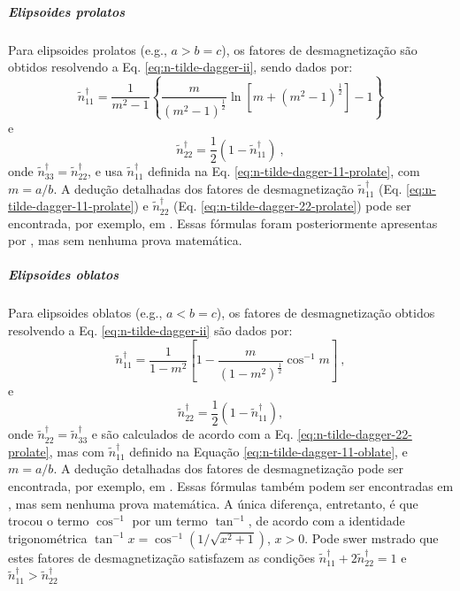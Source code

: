 \subparagraph*{Elipsoides prolatos}

Para elipsoides prolatos (e.g., $a > b = c$), os fatores de desmagnetização
são obtidos resolvendo a Eq. \ref{eq:n-tilde-dagger-ii}, sendo dados por:
\begin{equation}
\tilde{n}^{\dagger}_{11} = \frac{1}{m^{2} - 1}
\left\lbrace \frac{m}{\left( m^{2} - 1 \right)^{\frac{1}{2}}}
\ln \left[ m + \left( m^{2} - 1 \right)^{\frac{1}{2}} \right]
- 1 \right\rbrace
\label{eq:n-tilde-dagger-11-prolate}
\end{equation}
e
\begin{equation}
\tilde{n}^{\dagger}_{22} = \frac{1}{2} \left(1 - \tilde{n}^{\dagger}_{11} \right) \: ,
\label{eq:n-tilde-dagger-22-prolate}
\end{equation}
onde $\tilde{n}^{\dagger}_{33} = \tilde{n}^{\dagger}_{22}$, 
e usa $\tilde{n}^{\dagger}_{11}$ definida na 
Eq. \ref{eq:n-tilde-dagger-11-prolate}, com $m = a/b$.
A dedução detalhadas dos fatores de desmagnetização 
$\tilde{n}^{\dagger}_{11}$ (Eq. \ref{eq:n-tilde-dagger-11-prolate}) 
e $\tilde{n}^{\dagger}_{22}$ (Eq. \ref{eq:n-tilde-dagger-22-prolate})
pode ser encontrada, por exemplo, em \citet{stoner1945}. 
Essas fórmulas foram posteriormente apresentas por
\citet{emerson1985}, mas sem nenhuma prova matemática.

\subparagraph*{Elipsoides oblatos}

Para elipsoides oblatos (e.g., $a < b = c$), os fatores de desmagnetização
obtidos resolvendo a Eq. \ref{eq:n-tilde-dagger-ii} são dados por:
\begin{equation}
\tilde{n}^{\dagger}_{11} = 
\frac{1}{1 - m^{2}} \left[
1 - \frac{m}{\left( 1 - m^{2} \right)^{\frac{1}{2}}} \cos^{-1}m
\right] \: ,
\label{eq:n-tilde-dagger-11-oblate}
\end{equation}
e
\begin{equation}
\tilde{n}^{\dagger}_{22} = 
\frac{1}{2} \left(1 - \tilde{n}^{\dagger}_{11}\right) ,
\label{eq:n-tilde-dagger-22-oblate}
\end{equation}
onde $\tilde{n}^{\dagger}_{22}=\tilde{n}^{\dagger}_{33}$ e
são calculados de acordo com a Eq.
\ref{eq:n-tilde-dagger-22-prolate}, mas com $\tilde{n}^{\dagger}_{11}$ 
definido na Equação \ref{eq:n-tilde-dagger-11-oblate}, 
e $m = a/b$.
A dedução detalhadas dos fatores de desmagnetização 
pode ser encontrada, por exemplo, em \citet{stoner1945}.  Essas fórmulas
também podem ser encontradas em \citet{emerson1985}, mas sem nenhuma prova matemática.
A única diferença, entretanto, é que \citet{emerson1985} trocou o termo $\cos^{-1}$
por um termo $\tan^{-1}$, de acordo com a identidade trigonométrica
$\tan^{-1}x = \cos^{-1}(1/\sqrt{x^{2} + 1})$, $x > 0$. Pode swer mstrado que estes fatores de desmagnetização satisfazem as condições $\tilde{n}^{\dagger}_{11} + 2 \tilde{n}^{\dagger}_{22} = 1$ e $\tilde{n}^{\dagger}_{11} > \tilde{n}^{\dagger}_{22}$


